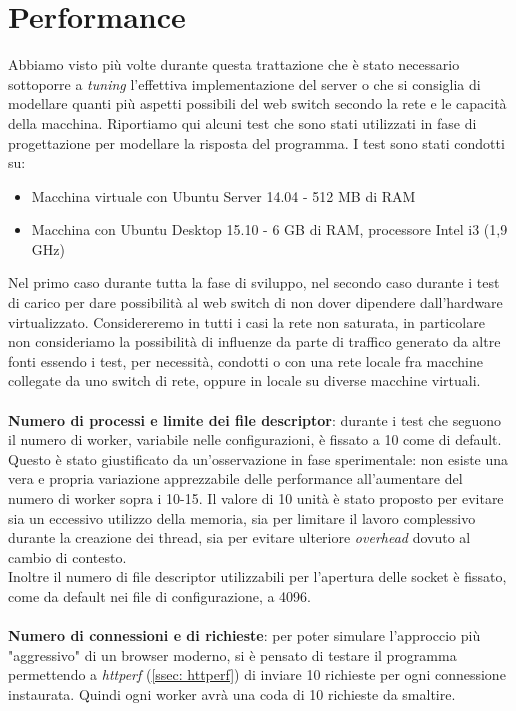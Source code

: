 \documentclass[italian]{tktltiki2}
\begin{document}
\section{Performance}
Abbiamo visto più volte durante questa trattazione che è stato necessario sottoporre a \emph{tuning} l'effettiva implementazione del server o che si consiglia di modellare quanti più aspetti possibili del web switch secondo la rete e le capacità della macchina. Riportiamo qui alcuni test che sono stati utilizzati in fase di progettazione per modellare la risposta del programma. I test sono stati condotti su:
  \begin{itemize}
    \item Macchina virtuale con Ubuntu Server 14.04 - 512 MB di RAM 
    \item Macchina con Ubuntu Desktop 15.10 - 6 GB di RAM, processore Intel i3 (1,9 GHz)   
  \end{itemize}
Nel primo caso durante tutta la fase di sviluppo, nel secondo caso durante i test di carico per dare possibilità al web switch di non dover dipendere dall'hardware virtualizzato. Considereremo in tutti i casi la rete non saturata, in particolare non consideriamo la possibilità di influenze da parte di traffico generato da altre fonti essendo i test, per necessità, condotti o con una rete locale fra macchine collegate da uno switch di rete, oppure in locale su diverse macchine virtuali. 
\\
\\ 
\textbf{Numero di processi e limite dei file descriptor}: durante i test che seguono il numero di worker, variabile nelle configurazioni, è fissato a 10 come di default. Questo è stato giustificato da un'osservazione in fase sperimentale: non esiste una vera e propria variazione apprezzabile delle performance all'aumentare del numero di worker sopra i 10-15. Il valore di 10 unità è stato proposto per evitare sia un eccessivo utilizzo della memoria, sia per limitare il lavoro complessivo durante la creazione dei thread, sia per evitare ulteriore \emph{overhead} dovuto al cambio di contesto. 
\\
Inoltre il numero di file descriptor utilizzabili per l'apertura delle socket è fissato, come da default nei file di configurazione, a 4096.
\\
\\
\textbf{Numero di connessioni e di richieste}: per poter simulare l'approccio più "aggressivo" di un browser moderno, si è pensato di testare il programma permettendo a \emph{httperf} (\ref{ssec: httperf}) di inviare 10 richieste per ogni connessione instaurata. Quindi ogni worker avrà una coda di 10 richieste da smaltire.
 
\end{document}
